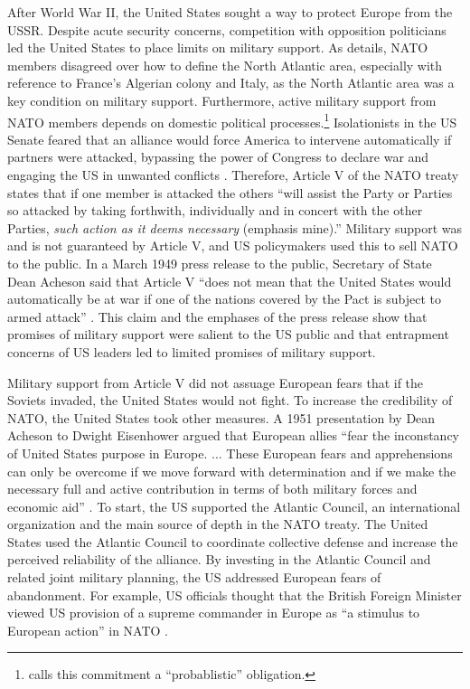 \documentclass[12pt]{article}
\begin{document}
After World War II, the United States sought a way to protect Europe from the USSR. 
Despite acute security concerns, competition with opposition politicians led the United States to place limits on military support. 
As \citet{Poast2019a} details, NATO members disagreed over how to define the North Atlantic area, especially with reference to France's Algerian colony and Italy, as the North Atlantic area was a key condition on military support. 
Furthermore, active military support from NATO members depends on domestic political processes.\footnote{\citet{Benson2012} calls this commitment a ``probablistic'' obligation.} 
Isolationists in the US Senate feared that an alliance would force America to intervene automatically if partners were attacked, bypassing the power of Congress to declare war and engaging the US in unwanted conflicts \citep[pg. 280-1]{Acheson1969}.
Therefore, Article V of the NATO treaty states that if one member is attacked the others ``will assist the Party or Parties so attacked by taking forthwith, individually and in concert with the other Parties, \emph{such action as it deems necessary} (emphasis mine).'' 
Military support was and is not guaranteed by Article V, and US policymakers used this to sell NATO to the public. 
In a March 1949 press release to the public, Secretary of State Dean Acheson said that Article V ``does not mean that the United States would automatically be at war if one of the nations covered by the Pact is subject to armed attack'' \citep{Acheson1949}.
This claim and the emphases of the press release show that promises of military support were salient to the US public and that entrapment concerns of US leaders led to limited promises of military support. 


Military support from Article V did not assuage European fears that if the Soviets invaded, the United States would not fight. 
To increase the credibility of NATO, the United States took other measures.  
A 1951 presentation by Dean Acheson to Dwight Eisenhower argued that European allies ``fear the inconstancy of United States purpose in Europe. ... These European fears and apprehensions can only be overcome if we move forward with determination and if we make the necessary full and active contribution in terms of both military forces and economic aid'' \citep[pg. 3]{Acheson1951}. 
To start, the US supported the Atlantic Council, an international organization and the main source of depth in the NATO treaty. 
The United States used the Atlantic Council to coordinate collective defense and increase the perceived reliability of the alliance. 
By investing in the Atlantic Council and related joint military planning, the US addressed European fears of abandonment. 
For example, US officials thought that the British Foreign Minister viewed US provision of a supreme commander in Europe as ``a stimulus to European action'' in NATO \citep{Acheson1950}. 
\end{document}
